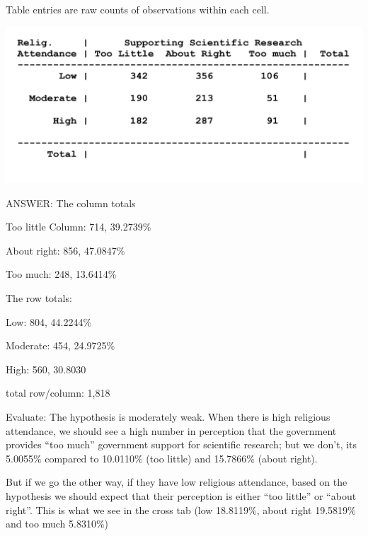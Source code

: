 \documentclass[
  letterpaper,
  DIV=11,
  numbers=noendperiod]{scrartcl}
\begin{document}
\begin{tcolorbox}[enhanced jigsaw, opacitybacktitle=0.6, bottomtitle=1mm, coltitle=black, colback=white, colframe=quarto-callout-note-color-frame, toprule=.15mm, leftrule=.75mm, breakable, left=2mm, bottomrule=.15mm, toptitle=1mm, arc=.35mm, titlerule=0mm, title=\textcolor{quarto-callout-note-color}{\faInfo}\hspace{0.5em}{Note}, opacityback=0, colbacktitle=quarto-callout-note-color!10!white, rightrule=.15mm]

Table entries are raw counts of observations within each cell.

\end{tcolorbox}

\includegraphics{img/ps2_cross_tab.png}

ANSWER: The column totals

Too little Column: 714, 39.2739\%

About right: 856, 47.0847\%

Too much: 248, 13.6414\%

The row totals:

Low: 804, 44.2244\%

Moderate: 454, 24.9725\%

High: 560, 30.8030

total row/column: 1,818

Evaluate: The hypothesis is moderately weak. When there is high
religious attendance, we should see a high number in perception that the
government provides ``too much'' government support for scientific
research; but we don't, its 5.0055\% compared to 10.0110\% (too little)
and 15.7866\% (about right).

But if we go the other way, if they have low religious attendance, based
on the hypothesis we should expect that their perception is either ``too
little'' or ``about right''. This is what we see in the cross tab (low
18.8119\%, about right 19.5819\% and too much 5.8310\%)
\end{document}
